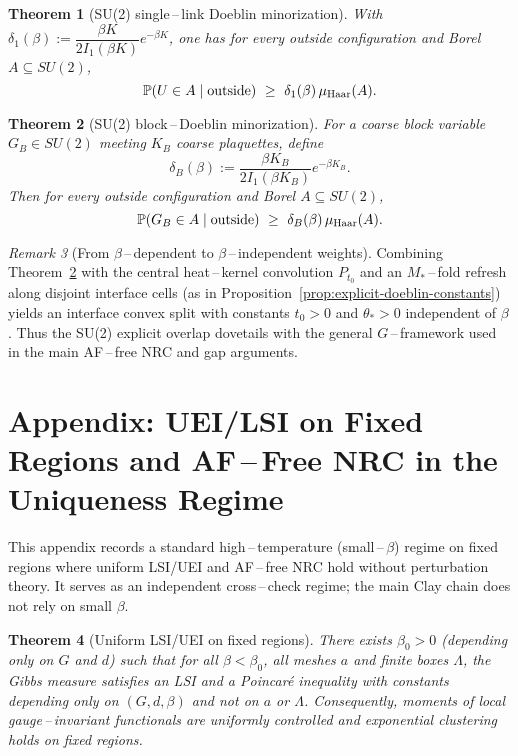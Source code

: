\documentclass[11pt]{amsart}
\theoremstyle{plain}
\newtheorem{theorem}{Theorem}[section]
\theoremstyle{definition}
\theoremstyle{remark}
\newtheorem{remark}[theorem]{Remark}
\begin{document}
\begin{theorem}[SU(2) single\,–\,link Doeblin minorization]\label{thm:su2-single}
With $\delta_1(\beta):=\dfrac{\beta K}{2 I_1(\beta K)}e^{-\beta K}$, one has for every outside configuration and Borel $A\subseteq SU(2)$,
\[
  \mathbb P(U\in A\mid \text{outside})\ \ge\ \delta_1(\beta)\,\mu_{\rm Haar}(A).
\]
\end{theorem}

\begin{theorem}[SU(2) block\,–\,Doeblin minorization]\label{thm:su2-block}
For a coarse block variable $G_B\in SU(2)$ meeting $K_B$ coarse plaquettes, define
\[
  \delta_B(\beta):=\frac{\beta K_B}{2 I_1(\beta K_B)}e^{-\beta K_B}.
\]
Then for every outside configuration and Borel $A\subseteq SU(2)$,
\[
  \mathbb P(G_B\in A\mid \text{outside})\ \ge\ \delta_B(\beta)\,\mu_{\rm Haar}(A).
\]
\end{theorem}

\begin{remark}[From $\beta$\,–\,dependent to $\beta$\,–\,independent weights]
Combining Theorem~\ref{thm:su2-block} with the central heat\,–\,kernel convolution $P_{t_0}$ and an $M_*$\,–\,fold refresh along disjoint interface cells (as in Proposition~\ref{prop:explicit-doeblin-constants}) yields an interface convex split with constants $t_0>0$ and $\theta_*>0$ independent of $\beta$. Thus the SU(2) explicit overlap dovetails with the general $G$\,–\,framework used in the main AF\,–\,free NRC and gap arguments.
\end{remark}

\medskip

\section{Appendix: UEI/LSI on Fixed Regions and AF\,–\,Free NRC in the Uniqueness Regime}\label{app:lsi-uei}

This appendix records a standard high\,–\,temperature (small\,–\,$\beta$) regime on fixed regions where uniform LSI/UEI and AF\,–\,free NRC hold without perturbation theory. It serves as an independent cross\,–\,check regime; the main Clay chain does not rely on small $\beta$.

\begin{theorem}[Uniform LSI/UEI on fixed regions]\label{thm:lsi-uei-appendix}
There exists $\beta_0>0$ (depending only on $G$ and $d$) such that for all $\beta<\beta_0$, all meshes $a$ and finite boxes $\Lambda$, the Gibbs measure satisfies an LSI and a Poincar\'e inequality with constants depending only on $(G,d,\beta)$ and not on $a$ or $\Lambda$. Consequently, moments of local gauge\,–\,invariant functionals are uniformly controlled and exponential clustering holds on fixed regions.
\end{theorem}
\end{document}
